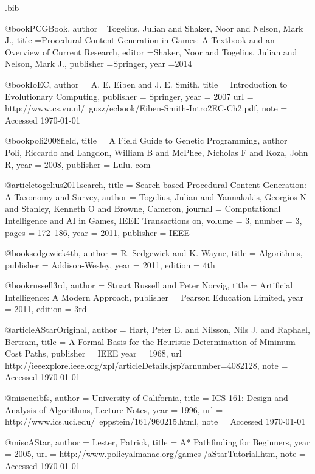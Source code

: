 \begin{filecontents*}{\jobname.bib}

@book{PCGBook,
	author	={Togelius, Julian and Shaker, Noor and Nelson, Mark J.},
	title		={{P}rocedural {C}ontent {G}eneration in {G}ames: {A} {T}extbook and an {O}verview of {C}urrent {R}esearch},
	editor		={Shaker, Noor and Togelius, Julian and Nelson, Mark J.},
	publisher	={Springer},
	year		={2014}
}

@book{IoEC,
	author 	= {A. E. Eiben and J. E. Smith},
	title 		= {{I}ntroduction to {E}volutionary {C}omputing},
	publisher 	= {Springer},
	year 		= {2007}
	url 		= {http://www.cs.vu.nl/~gusz/ecbook/Eiben-Smith-Intro2EC-Ch2.pdf},
	note		= {Accessed \today}
}

@book{poli2008field,
	title		= {{A} {F}ield {G}uide to {G}enetic {P}rogramming},
	author	= {Poli, Riccardo and Langdon, William B and McPhee, Nicholas F and Koza, John R},
	year		= {2008},
	publisher	= {Lulu. com}
}

@article{togelius2011search,
	title 		= {{S}earch-based {P}rocedural {C}ontent {G}eneration: {A} {T}axonomy and {S}urvey},
	author 	= {Togelius, Julian and Yannakakis, Georgios N and Stanley, Kenneth O and Browne, Cameron},
	journal 	= {Computational Intelligence and AI in Games, IEEE Transactions on},
	volume 	= {3},
	number	= {3},
	pages		= {172--186},
	year		= {2011},
	publisher	= {IEEE}
}

@book{sedgewick4th,
	author	= {R. Sedgewick and K. Wayne},
	title		= {Algorithms},
	publisher	= {Addison-Wesley},
	year		= {2011},
	edition	= {4th}
}

@book{russell3rd,
	author	= {Stuart Russell and Peter Norvig},
	title		= {Artificial Intelligence: A Modern Approach},
	publisher	= {Pearson Education Limited},
	year		= {2011},
	edition	= {3rd}
}


@article{AStarOriginal,
	author 	= {Hart, Peter E. and Nilsson, Nils J. and Raphael, Bertram},
	title 		= {{A} {F}ormal {B}asis for the {H}euristic {D}etermination of {M}inimum {C}ost {P}aths},
	publisher	= {IEEE}
	year 		= {1968}, 
	url 		= {http://ieeexplore.ieee.org/xpl/articleDetails.jsp?arnumber=4082128},
	note		= {Accessed \today}
}

@misc{ucibfs,
	author 	= {University of California},
	title 		= {{I}{C}{S} 161: Design and Analysis of Algorithms, Lecture Notes},
	year 		= {1996}, 
	url 		= {http://www.ics.uci.edu/~eppstein/161/960215.html},
	note		= {Accessed \today}
}

@misc{AStar,
	author 	= {Lester, Patrick},
	title 		= {A* Pathfinding for Beginners},
	year 		= {2005}, 
	url 		= {http://www.policyalmanac.org/games /aStarTutorial.htm},
	note		= {Accessed \today}
}


\end{filecontents*}
